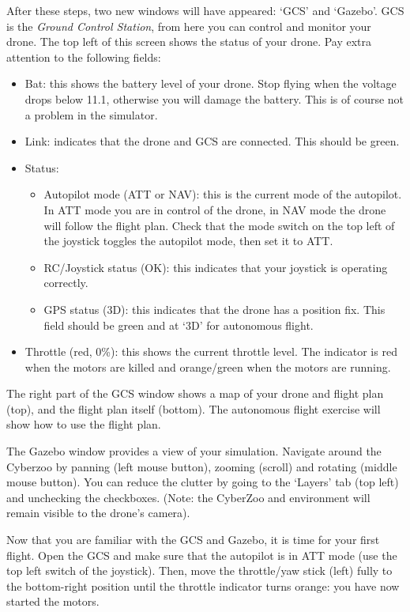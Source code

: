 \documentclass{article}
\begin{document}
After these steps, two new windows will have appeared: `GCS' and `Gazebo'.
GCS is the \emph{Ground Control Station}, from here you can control and monitor your drone.
The top left of this screen shows the status of your drone. Pay extra attention to the following fields:
\begin{itemize}
\item Bat: this shows the battery level of your drone. Stop flying when the voltage drops below 11.1, otherwise you will damage the battery. This is of course not a problem in the simulator.
\item Link: indicates that the drone and GCS are connected. This should be green.
\item Status:
\begin{itemize}
\item Autopilot mode (ATT or NAV): this is the current mode of the autopilot. In ATT mode you are in control of the drone, in NAV mode the drone will follow the flight plan. Check that the mode switch on the top left of the joystick toggles the autopilot mode, then set it to ATT.
\item RC/Joystick status (OK): this indicates that your joystick is operating correctly.
\item GPS status (3D): this indicates that the drone has a position fix. This field should be green and at `3D' for autonomous flight.
\end{itemize}
\item Throttle (red, 0\%): this shows the current throttle level. The indicator is red when the motors are killed and orange/green when the motors are running.
\end{itemize}
The right part of the GCS window shows a map of your drone and flight plan (top), and the flight plan itself (bottom). The autonomous flight exercise will show how to use the flight plan.

\medskip
The Gazebo window provides a view of your simulation. Navigate around the Cyberzoo by panning (left mouse button), zooming (scroll) and rotating (middle mouse button).
You can reduce the clutter by going to the `Layers' tab (top left) and unchecking the checkboxes. (Note: the CyberZoo and environment will remain visible to the drone's camera).

\medskip
Now that you are familiar with the GCS and Gazebo, it is time for your first flight.
Open the GCS and make sure that the autopilot is in ATT mode (use the top left switch of the joystick). Then, move the throttle/yaw stick (left) fully to the bottom-right position until the throttle indicator turns orange: you have now started the motors.
\end{document}
